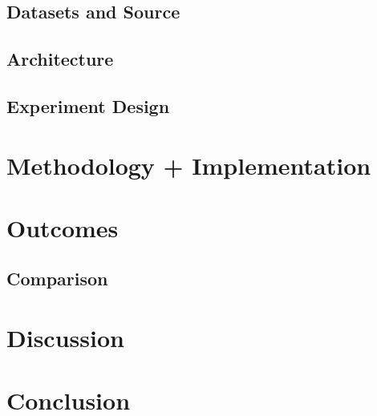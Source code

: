 \documentclass[runningheads]{llncs}
\begin{document}
\subsection{Datasets and Source}
\subsection{Architecture}
\subsection{Experiment Design}

\section{Methodology + Implementation}

\section{Outcomes}

\subsection{Comparison}

\section{Discussion}

\section{Conclusion}




%
%

%
%
%
% 
% 
%
\end{document}
